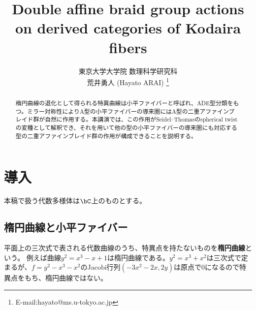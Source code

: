 \documentclass[uplatex,11pt,a4paper,dvipdfmx]{jsarticle}
\title{Double affine braid group actions on derived categories of Kodaira fibers}    %
\author{東京大学大学院 数理科学研究科 \\
荒井勇人 (Hayato ARAI) 
\footnote{E-mail:hayato@ms.u-tokyo.ac.jp}}
\date{}    %
\numberwithin{equation}{section}
\numberwithin{figure}{section}
\theoremstyle{definition}
\begin{document}
\maketitle

\begin{abstract}   %
    楕円曲線の退化として得られる特異曲線は小平ファイバーと呼ばれ、ADE型分類をもつ。ミラー対称性によりA型の小平ファイバーの導来圏にはA型の二重アファインブレイド群が自然に作用する。本講演では、この作用がSeidel--Thomasのspherical twistの変種として解釈でき、それを用いて他の型の小平ファイバーの導来圏にも対応する型の二重アファインブレイド群の作用が構成できることを説明する。
\end{abstract}


\section{導入}
本稿で扱う代数多様体は$\bC$上のものとする。
\subsection{楕円曲線と小平ファイバー}

平面上の三次式で表される代数曲線のうち、特異点を持たないものを\textbf{楕円曲線}という。
例えば曲線$y^2 = x^3 - x + 1$は楕円曲線である。$y^2 = x^3 + x^2$は三次式で定まるが、$f = y^2-x^3 - x^2$のJacobi行列$(-3x^2-2x, 2y)$は原点で$0$になるので特異点をもち、楕円曲線ではない。
\end{document}
